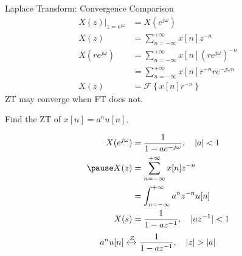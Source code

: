 \begin{frame}{Laplace Transform: Convergence Comparison}
    \begin{align*}
        \left.X(z)\right|_{z=e^{j\omega}} &= X(e^{j\omega})\\
        X(z) &= \sum_{n=-\infty}^{+\infty}x[n]z^{-n}\\
        X(re^{j\omega}) &= \sum_{n=-\infty}^{+\infty}x[n]\left(re^{j\omega}\right)^{-n}\\
        &= \sum_{n=-\infty}^{+\infty}x[n]r^{-n}re^{-j\omega n}\\
        X(z) &= \mathcal{F}\left\{ x[n]r^{-n}\right\}
    \end{align*}
    {
        ZT may converge when FT does not.
    }
\end{frame}

\begin{frame}[t]{}
    \begin{example}
        Find the ZT of
        $
            x[n] = a^nu[n].
        $
    \end{example}

    {
        \begin{solution}
            \begin{align*}
                X(e^{j\omega}) &= \frac{1}{1-ae^{-j\omega}}, \quad |a|<1\\
                \pause
                X(z) &= \sum_{n=-\infty}^{+\infty}x[n]z^{-n}\\
                &= \int_{n=-\infty}^{+\infty}a^nz^{-n}u[n]\\
                X(s) &= \frac{1}{1-az^{-1}}, \quad |az^{-1}|< 1\\
            \end{align*}\pause
            \begin{equation*}
                a^nu[n] \xleftrightarrow{\mathcal{Z}}   \frac{1}{1-az^{-1}}, \quad |z|> |a|
            \end{equation*}
        \end{solution}
    }

\end{frame}





